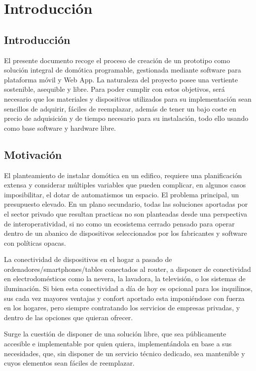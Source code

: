 \cleardoublepage

\chapter{Introducción}

\section{Introducción}
\label{ch:Capitulo1}
El presente documento recoge el proceso de creación de un prototipo como solución integral de domótica programable, gestionada mediante software para plataforma móvil y Web App. La naturaleza del proyecto posee una vertiente sostenible, asequible y libre. Para poder cumplir con estos objetivos, será necesario que los materiales y dispositivos utilizados para su implementación sean sencillos de adquirir, fáciles de reemplazar, además de tener un bajo coste en precio de adquisición y de tiempo necesario para su instalación, todo ello usando como base software y hardware libre.

\section{Motivación}
\label{ch:Capitulo1.1}

El planteamiento de instalar domótica en un edifico, requiere una planificación extensa y considerar múltiples variables que pueden complicar, en algunos casos imposibilitar, el dotar de automatismos un espacio.
El problema principal, un presupuesto elevado. En un plano secundario, todas las soluciones aportadas por el sector privado que resultan practicas no son planteadas desde una perspectiva de interoperatividad, si no como un ecosistema cerrado pensado para operar dentro de un abanico de dispositivos seleccionados por los fabricantes y software con políticas opacas.

La conectividad de dispositivos en el hogar a pasado de ordenadores/smartphones/tables conectados al router, a disponer de conectividad en electrodomésticos como la nevera, la lavadora, la televisión, o los sistemas de iluminación. Si bien esta conectividad a día de hoy es opcional para los inquilinos, sus cada vez mayores ventajas y confort aportado esta imponiéndose con fuerza en los hogares, pero siempre contratando los servicios de empresas privadas, y dentro de las opciones que quieran ofrecer.

Surge la cuestión de disponer de una solución libre, que sea públicamente accesible e implementable por quien quiera, implementándola en base a sus necesidades, que, sin disponer de un servicio técnico dedicado, sea mantenible y cuyos elementos sean fáciles de reemplazar.


